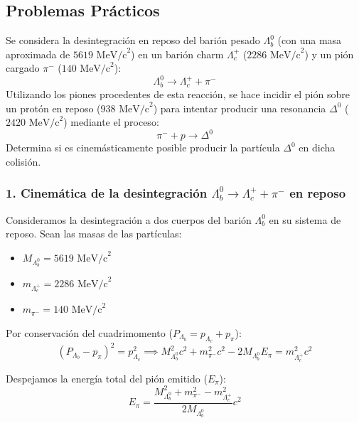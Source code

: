 \subsection{Problemas Prácticos}
\begin{problema}
Se considera la desintegración en reposo del barión pesado $\Lambda_b^0$ (con una masa aproximada de $5619\text{ MeV/c}^2$) en un barión charm $\Lambda_c^+$ ($2286\text{ MeV/c}^2$) y un pión cargado $\pi^-$ ($140\text{ MeV/c}^2$):
\begin{equation*}
\Lambda_b^0 \longrightarrow \Lambda_c^+ + \pi^-
\end{equation*}
Utilizando los piones procedentes de esta reacción, se hace incidir el pión sobre un protón en reposo ($938\text{ MeV/c}^2$) para intentar producir una resonancia $\Delta^0$ ($2420\text{ MeV/c}^2$) mediante el proceso:
\begin{equation*}
\pi^- + p \longrightarrow \Delta^0
\end{equation*}
Determina si es cinemásticamente posible producir la partícula $\Delta^0$ en dicha colisión.

\tcblower

\subsubsection*{1. Cinemática de la desintegración $\Lambda_b^0 \rightarrow \Lambda_c^+ + \pi^-$ en reposo}

Consideramos la desintegración a dos cuerpos del barión $\Lambda_b^0$ en su sistema de reposo. Sean las masas de las partículas:
\begin{itemize}
    \item $M_{\Lambda_b^0} = 5619\text{ MeV/c}^2$
    \item $m_{\Lambda_c^+} = 2286\text{ MeV/c}^2$
    \item $m_{\pi^-} = 140\text{ MeV/c}^2$
\end{itemize}

Por conservación del cuadrimomento ($P_{\Lambda_b} = p_{\Lambda_c} + p_\pi$):
\begin{equation*}
(P_{\Lambda_b} - p_\pi)^2 = p_{\Lambda_c}^2 \implies M_{\Lambda_b^0}^2 c^2 + m_{\pi^-}^2 c^2 - 2 M_{\Lambda_b^0} E_\pi = m_{\Lambda_c^+}^2 c^2
\end{equation*}

Despejamos la energía total del pión emitido ($E_\pi$):
\begin{equation*}
E_\pi = \frac{M_{\Lambda_b^0}^2 + m_{\pi^-}^2 - m_{\Lambda_c^+}^2}{2 M_{\Lambda_b^0}} c^2
\end{equation*}


\end{problema}
